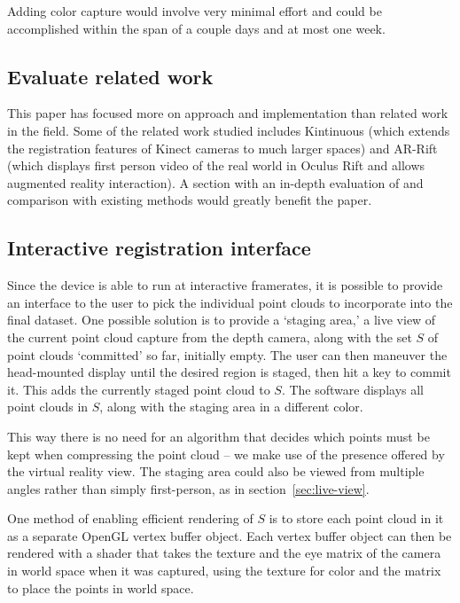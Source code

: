 \documentclass[pageno]{jpaper}
\begin{document}
Adding color capture would involve very minimal effort and could be accomplished
within the span of a couple days and at most one week.

\subsection{Evaluate related work}

This paper has focused more on approach and implementation than related work in
the field. Some of the related work studied includes Kintinuous (which extends
the registration features of Kinect cameras to much larger spaces) and AR-Rift
(which displays first person video of the real world in Oculus Rift and allows
augmented reality interaction). A section with an in-depth evaluation of and
comparison with existing methods would greatly benefit the paper.

\subsection{Interactive registration interface}

Since the device is able to run at interactive framerates, it is possible to
provide an interface to the user to pick the individual point clouds to
incorporate into the final dataset. One possible solution is to provide a
`staging area,' a live view of the current point cloud capture from the depth
camera, along with the set $S$ of point clouds `committed' so far, initially
empty. The user can then maneuver the head-mounted display until the desired
region is staged, then hit a key to commit it. This adds the currently staged
point cloud to $S$. The software displays all point clouds in $S$, along with
the staging area in a different color.

This way there is no need for an algorithm that decides which points must be
kept when compressing the point cloud -- we make use of the presence offered by
the virtual reality view. The staging area could also be viewed from multiple
angles rather than simply first-person, as in section~\ref{sec:live-view}.

One method of enabling efficient rendering of $S$ is to store each point cloud
in it as a separate OpenGL vertex buffer object. Each vertex buffer object can
then be rendered with a shader that takes the texture and the eye matrix of the
camera in world space when it was captured, using the texture for color and the
matrix to place the points in world space.
\end{document}
